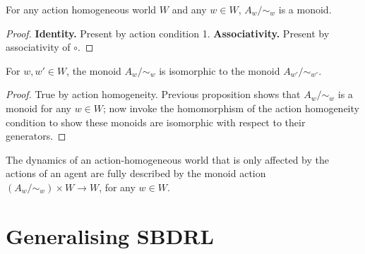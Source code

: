 \begin{proposition}
    For any action homogeneous world $W$ and any $w \in W$, $A_{w}/\sim_{w}$ is a monoid.
\end{proposition}
\begin{proof}    \textbf{Identity.} Present by action condition 1.
    \textbf{Associativity.} Present by associativity of $\circ$.
\end{proof}

\begin{proposition}
    For $w, w' \in W$, the monoid $A_{w}/\sim_{w}$ is isomorphic to the monoid $A_{w'}/\sim_{w'}$.
\end{proposition}
\begin{proof}
    True by action homogeneity.
    Previous proposition shows that $A_{w}/\sim_{w}$ is a monoid for any $w \in W$; now invoke the homomorphism of the action homogeneity condition to show these monoids are isomorphic with respect to their generators.
\end{proof}

\begin{remark}
    The dynamics of an action-homogeneous world that is only affected by the actions of an agent are fully described by the monoid action $(A_{w}/\sim_{w}) \times W \to W$, for any $w \in W$.
\end{remark}







\section{Generalising SBDRL}

